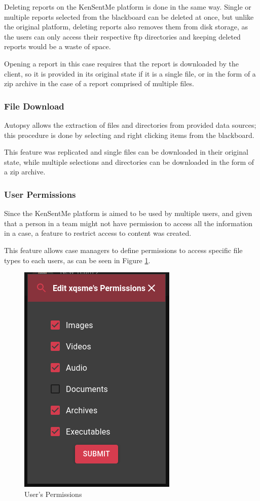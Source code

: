 Deleting reports on the KenSentMe platform is done in the same way. Single or multiple reports selected from the blackboard can be deleted at once, but unlike the original platform, deleting reports also removes them from disk storage, 
as the users can only access their respective \acrshort{ftp} directories and keeping deleted reports would be a waste of space.

Opening a report in this case requires that the report is downloaded by the client, so it is provided in its original state if it is a single file, or in the form of a zip archive in the case of a report comprised of multiple files.

\subsubsection*{File Download}

Autopsy allows the extraction of files and directories from provided data sources; this procedure is done by selecting and right clicking items from the blackboard.

This feature was replicated and single files can be downloaded in their original state, while multiple selections and directories can be downloaded in the form of a zip archive.

\subsubsection*{User Permissions}

Since the KenSentMe platform is aimed to be used by multiple users, and given that a person in a team might not have permission to access all the information in a case, a feature to restrict access to content was created.

This feature allows case managers to define permissions to access specific file types to each users, as can be seen in Figure \ref{fig:permissions}.

\begin{figure}[ht]
 \centering
 \includegraphics[width=0.35\linewidth]{imgs/permissions.png}
 \caption{User's Permissions}
 \label{fig:permissions}
\end{figure}

